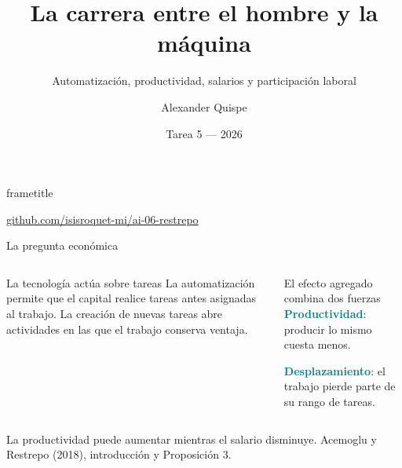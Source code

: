 \documentclass[aspectratio=169,11pt]{beamer}
\title{La carrera entre el hombre y la máquina}
\subtitle{Automatización, productividad, salarios y participación laboral}
\author{Alexander Quispe}
\institute{IA y Modelamiento Económico}
\date{Tarea 5 --- 2026}
\newcommand{\key}[1]{\textcolor{teal}{\textbf{#1}}}
\newcommand{\source}[1]{\vfill\hfill{\tiny\color{gray}#1}}
\begin{document}
\begin{frame}[plain]
  \begin{beamercolorbox}[wd=\paperwidth,ht=\paperheight,dp=0ex,sep=1.15cm]{frametitle}
    \vspace{0.45cm}
    {\LARGE\bfseries\inserttitle\par}
    \vspace{0.25cm}
    {\large\insertsubtitle\par}
    \vspace{1.05cm}
    {\normalsize\insertauthor\par}
    {\small\insertinstitute\par}
    \vspace{0.65cm}
    {\small\href{https://github.com/isisroquet-mi/ai-06-restrepo}{github.com/isisroquet-mi/ai-06-restrepo}\par}
    \vfill
    {\small\insertdate\par}
  \end{beamercolorbox}
\end{frame}

\begin{frame}{La pregunta económica}
  \begin{columns}[T,onlytextwidth]
      \begin{block}{La tecnología actúa sobre tareas}
        La automatización permite que el capital realice tareas antes asignadas al trabajo.
        La creación de nuevas tareas abre actividades en las que el trabajo conserva ventaja.
      \end{block}
      \begin{block}{El efecto agregado combina dos fuerzas}
        \key{Productividad}: producir lo mismo cuesta menos.

        \key{Desplazamiento}: el trabajo pierde parte de su rango de tareas.
      \end{block}
  \end{columns}
  \vspace{0.45cm}
  \centering
  \Large La productividad puede aumentar mientras el salario disminuye.
  \source{Acemoglu y Restrepo (2018), introducción y Proposición 3.}
\end{frame}
\end{document}
